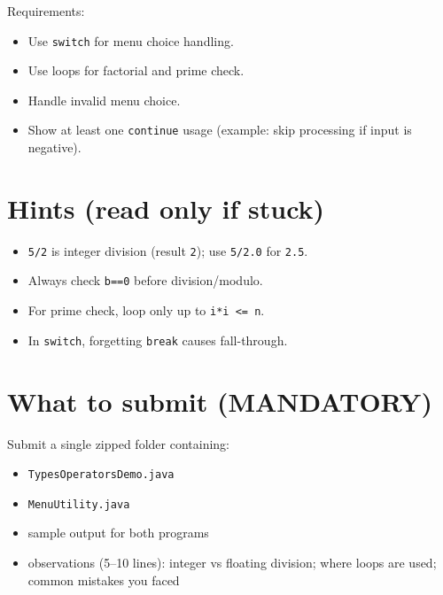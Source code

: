 \documentclass[11pt]{article}
\begin{document}
\noindent Requirements:
\begin{itemize}[leftmargin=*]
  \item Use \texttt{switch} for menu choice handling.
  \item Use loops for factorial and prime check.
  \item Handle invalid menu choice.
  \item Show at least one \texttt{continue} usage (example: skip processing if input is negative).
\end{itemize}

\section{Hints (read only if stuck)}
\begin{itemize}[leftmargin=*]
  \item \texttt{5/2} is integer division (result \texttt{2}); use \texttt{5/2.0} for \texttt{2.5}.
  \item Always check \texttt{b==0} before division/modulo.
  \item For prime check, loop only up to \texttt{i*i <= n}.
  \item In \texttt{switch}, forgetting \texttt{break} causes fall-through.
\end{itemize}

\section{What to submit (MANDATORY)}
Submit a single zipped folder containing:
\begin{itemize}[leftmargin=*]
  \item \texttt{TypesOperatorsDemo.java}
  \item \texttt{MenuUtility.java}
  \item sample output for both programs
  \item observations (5--10 lines): integer vs floating division; where loops are used; common mistakes you faced
\end{itemize}

\notesources{\OOPSUnitISources}
\end{document}
